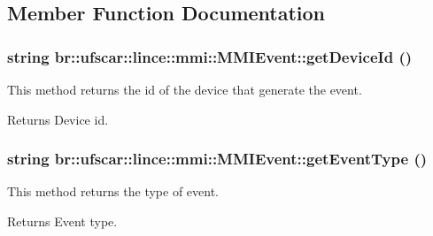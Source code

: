 \subsection{Member Function Documentation}
\hypertarget{classbr_1_1ufscar_1_1lince_1_1mmi_1_1MMIEvent_a3bef1a44ba5335235b90dd89450d2b5c}{
\subsubsection[{getDeviceId}]{\setlength{\rightskip}{0pt plus 5cm}string br::ufscar::lince::mmi::MMIEvent::getDeviceId ()}}
\label{classbr_1_1ufscar_1_1lince_1_1mmi_1_1MMIEvent_a3bef1a44ba5335235b90dd89450d2b5c}


This method returns the id of the device that generate the event. 

\begin{DoxyReturn}{Returns}
Device id. 
\end{DoxyReturn}
\hypertarget{classbr_1_1ufscar_1_1lince_1_1mmi_1_1MMIEvent_a57aeaad0d4209139079bbc1314818c6a}{
\subsubsection[{getEventType}]{\setlength{\rightskip}{0pt plus 5cm}string br::ufscar::lince::mmi::MMIEvent::getEventType ()}}
\label{classbr_1_1ufscar_1_1lince_1_1mmi_1_1MMIEvent_a57aeaad0d4209139079bbc1314818c6a}


This method returns the type of event. 

\begin{DoxyReturn}{Returns}
Event type. 
\end{DoxyReturn}


